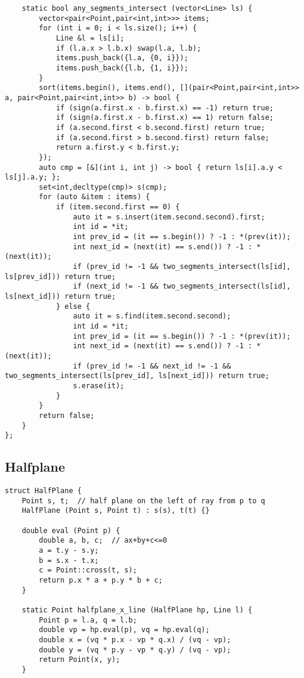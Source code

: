 \documentclass[10pt,landscape]{article}
\begin{document}
\begin{multicols}{2}
\begin{lstlisting}
	static bool any_segments_intersect (vector<Line> ls) {
		vector<pair<Point,pair<int,int>>> items;
		for (int i = 0; i < ls.size(); i++) {
			Line &l = ls[i];
			if (l.a.x > l.b.x) swap(l.a, l.b);
			items.push_back({l.a, {0, i}});
			items.push_back({l.b, {1, i}});
		}
		sort(items.begin(), items.end(), [](pair<Point,pair<int,int>> a, pair<Point,pair<int,int>> b) -> bool {
			if (sign(a.first.x - b.first.x) == -1) return true;
			if (sign(a.first.x - b.first.x) == 1) return false;
			if (a.second.first < b.second.first) return true;
			if (a.second.first > b.second.first) return false;
			return a.first.y < b.first.y;
		});
		auto cmp = [&](int i, int j) -> bool { return ls[i].a.y < ls[j].a.y; };
		set<int,decltype(cmp)> s(cmp);
		for (auto &item : items) {
			if (item.second.first == 0) {
				auto it = s.insert(item.second.second).first;
				int id = *it;
				int prev_id = (it == s.begin()) ? -1 : *(prev(it));
				int next_id = (next(it) == s.end()) ? -1 : *(next(it));
				if (prev_id != -1 && two_segments_intersect(ls[id], ls[prev_id])) return true;
				if (next_id != -1 && two_segments_intersect(ls[id], ls[next_id])) return true;
			} else {
				auto it = s.find(item.second.second);
				int id = *it;
				int prev_id = (it == s.begin()) ? -1 : *(prev(it));
				int next_id = (next(it) == s.end()) ? -1 : *(next(it));
				if (prev_id != -1 && next_id != -1 && two_segments_intersect(ls[prev_id], ls[next_id])) return true;
				s.erase(it);
			}
		}
		return false;
	}
};
\end{lstlisting}
\subsection{Halfplane}
\begin{lstlisting}
struct HalfPlane {
	Point s, t;  // half plane on the left of ray from p to q
	HalfPlane (Point s, Point t) : s(s), t(t) {}

	double eval (Point p) {
		double a, b, c;  // ax+by+c<=0
		a = t.y - s.y;
		b = s.x - t.x;
		c = Point::cross(t, s);
		return p.x * a + p.y * b + c;
	}

	static Point halfplane_x_line (HalfPlane hp, Line l) {
		Point p = l.a, q = l.b;
		double vp = hp.eval(p), vq = hp.eval(q);
		double x = (vq * p.x - vp * q.x) / (vq - vp);
		double y = (vq * p.y - vp * q.y) / (vq - vp);
		return Point(x, y);
	}


\end{lstlisting}
\end{multicols}
\end{document}
